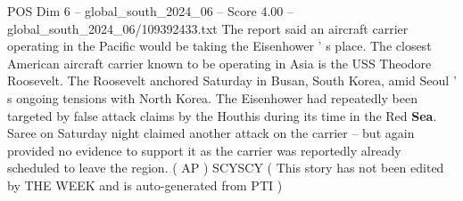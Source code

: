 \begin{textsample}{POS Dim 6 – global\_south\_2024\_06 – Score 4.00 – global\_south\_2024\_06/109392433.txt}
The report said an aircraft carrier operating in the Pacific would be taking the Eisenhower ' s place.
The closest American aircraft carrier known to be operating in Asia is the USS Theodore Roosevelt.
The Roosevelt anchored Saturday in Busan, South Korea, amid Seoul ' s ongoing tensions with North Korea.
The Eisenhower had repeatedly been targeted by false attack claims by the Houthis during its time in the Red \textbf{Sea}.
Saree on Saturday night claimed another attack on the carrier -- but again provided no evidence to support it as the carrier was reportedly already scheduled to leave the region. ( AP ) SCYSCY ( This story has not been edited by THE WEEK and is auto-generated from PTI )

\end{textsample}
